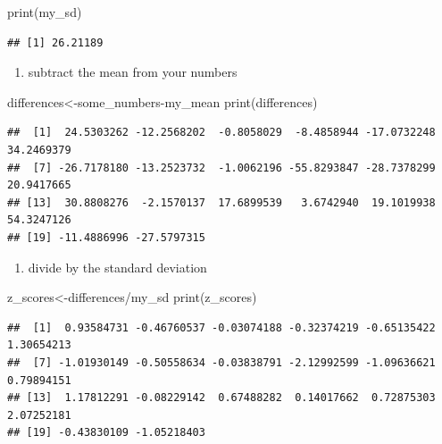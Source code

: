\documentclass[
]{book}
\newenvironment{Shaded}{\begin{snugshade}}{\end{snugshade}}
\newcommand{\FunctionTok}[1]{\textcolor[rgb]{0.00,0.00,0.00}{#1}}
\newcommand{\NormalTok}[1]{#1}
\newcommand{\OtherTok}[1]{\textcolor[rgb]{0.56,0.35,0.01}{#1}}
\newcommand{\SpecialCharTok}[1]{\textcolor[rgb]{0.00,0.00,0.00}{#1}}
\providecommand{\tightlist}{%
  \setlength{\itemsep}{0pt}\setlength{\parskip}{0pt}}
\begin{document}
\begin{Shaded}
\begin{Highlighting}[]
\FunctionTok{print}\NormalTok{(my\_sd)}
\end{Highlighting}
\end{Shaded}

\begin{verbatim}
## [1] 26.21189
\end{verbatim}

\begin{enumerate}
\def\labelenumi{\arabic{enumi}.}
\setcounter{enumi}{2}
\tightlist
\item
  subtract the mean from your numbers
\end{enumerate}

\begin{Shaded}
\begin{Highlighting}[]
\NormalTok{differences}\OtherTok{\textless{}{-}}\NormalTok{some\_numbers}\SpecialCharTok{{-}}\NormalTok{my\_mean}
\FunctionTok{print}\NormalTok{(differences)}
\end{Highlighting}
\end{Shaded}

\begin{verbatim}
##  [1]  24.5303262 -12.2568202  -0.8058029  -8.4858944 -17.0732248  34.2469379
##  [7] -26.7178180 -13.2523732  -1.0062196 -55.8293847 -28.7378299  20.9417665
## [13]  30.8808276  -2.1570137  17.6899539   3.6742940  19.1019938  54.3247126
## [19] -11.4886996 -27.5797315
\end{verbatim}

\begin{enumerate}
\def\labelenumi{\arabic{enumi}.}
\setcounter{enumi}{3}
\tightlist
\item
  divide by the standard deviation
\end{enumerate}

\begin{Shaded}
\begin{Highlighting}[]
\NormalTok{z\_scores}\OtherTok{\textless{}{-}}\NormalTok{differences}\SpecialCharTok{/}\NormalTok{my\_sd}
\FunctionTok{print}\NormalTok{(z\_scores)}
\end{Highlighting}
\end{Shaded}

\begin{verbatim}
##  [1]  0.93584731 -0.46760537 -0.03074188 -0.32374219 -0.65135422  1.30654213
##  [7] -1.01930149 -0.50558634 -0.03838791 -2.12992599 -1.09636621  0.79894151
## [13]  1.17812291 -0.08229142  0.67488282  0.14017662  0.72875303  2.07252181
## [19] -0.43830109 -1.05218403
\end{verbatim}
\end{document}
